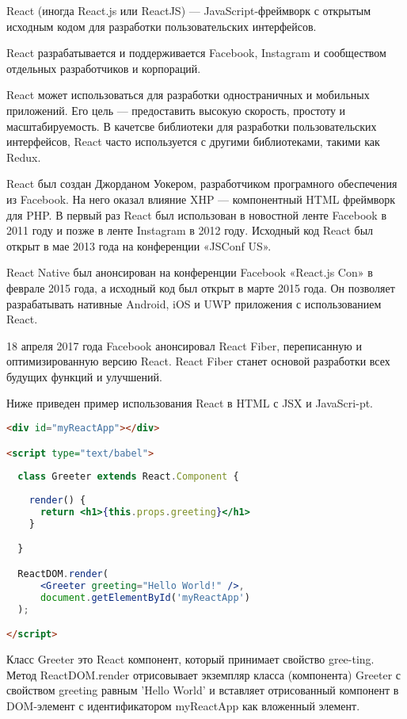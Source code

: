 React (иногда React.js или ReactJS) — JavaScript-фреймворк с открытым исходным кодом для разработки пользовательских интерфейсов.

React разрабатывается и поддерживается Facebook, Instagram и сообществом отдельных разработчиков и корпораций.

React может использоваться для разработки одностраничных и мобильных приложений. Его цель — предоставить высокую скорость,
простоту и масштабируемость. В качетсве библиотеки для разработки пользовательских интерфейсов, React часто используется с другими библиотеками,
такими как Redux.

React был создан Джорданом Уокером, разработчиком програмного обеспечения из Facebook. На него оказал влияние XHP — компонентный HTML фреймворк для PHP.
В первый раз React был использован в новостной ленте Facebook в 2011 году и позже в ленте Instagram в 2012 году. Исходный код React был открыт в мае 2013
года на конференции «JSConf US».

React Native был анонсирован на конференции Facebook «React.js Con» в феврале 2015 года, а исходный код был открыт в марте 2015 года. Он позволяет
разрабатывать нативные Android, iOS и UWP приложения с использованием React.

18 апреля 2017 года Facebook анонсировал React Fiber, переписанную и оптимизированную версию React. React Fiber станет основой разработки всех
будущих функций и улучшений.

Ниже приведен пример использования React в HTML с JSX и JavaScri-pt.

\begin{lstlisting}[language=HTML, label=lst:domain:reactjs]
<div id="myReactApp"></div>

<script type="text/babel">
  
  class Greeter extends React.Component { 
    
    render() { 
      return <h1>{this.props.greeting}</h1>
    } 

  } 

  ReactDOM.render(
      <Greeter greeting="Hello World!" />,
      document.getElementById('myReactApp')
  );

</script>
\end{lstlisting}

Класс Greeter это React компонент, который принимает свойство gree-ting. Метод ReactDOM.render отрисовывает
экземпляр класса (компонента) Greeter с свойством greeting равным 'Hello World' и вставляет отрисованный компонент в
DOM-элемент с идентификатором myReactApp как вложенный элемент.

